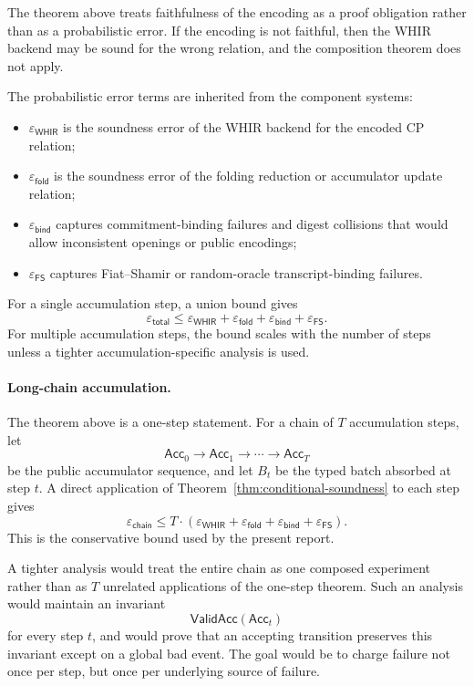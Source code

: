 \documentclass[11pt]{article}
\theoremstyle{definition}
\newcommand{\WHIR}{\mathsf{WHIR}}
\newcommand{\Acc}{\mathsf{Acc}}
\begin{document}
The theorem above treats faithfulness of the encoding as a proof obligation
rather than as a probabilistic error. If the encoding is not faithful, then the
WHIR backend may be sound for the wrong relation, and the composition theorem
does not apply.

The probabilistic error terms are inherited from the component systems:
\begin{itemize}
  \item $\varepsilon_{\WHIR}$ is the soundness error of the WHIR backend for the
        encoded CP relation;
  \item $\varepsilon_{\mathsf{fold}}$ is the soundness error of the folding
        reduction or accumulator update relation;
  \item $\varepsilon_{\mathsf{bind}}$ captures commitment-binding failures and
        digest collisions that would allow inconsistent openings or public
        encodings;
  \item $\varepsilon_{\mathsf{FS}}$ captures Fiat--Shamir or random-oracle
        transcript-binding failures.
\end{itemize}

For a single accumulation step, a union bound gives
\[
  \varepsilon_{\mathsf{total}}
  \leq
  \varepsilon_{\WHIR}
  +
  \varepsilon_{\mathsf{fold}}
  +
  \varepsilon_{\mathsf{bind}}
  +
  \varepsilon_{\mathsf{FS}}.
\]
For multiple accumulation steps, the bound scales with the number of steps
unless a tighter accumulation-specific analysis is used.

\paragraph{Long-chain accumulation.}
The theorem above is a one-step statement. For a chain of \(T\) accumulation
steps, let
\[
  \Acc_0 \to \Acc_1 \to \cdots \to \Acc_T
\]
be the public accumulator sequence, and let \(B_t\) be the typed batch absorbed
at step \(t\). A direct application of Theorem~\ref{thm:conditional-soundness}
to each step gives
\[
  \varepsilon_{\mathsf{chain}}
  \leq
  T\cdot
  \left(
    \varepsilon_{\WHIR}
    +
    \varepsilon_{\mathsf{fold}}
    +
    \varepsilon_{\mathsf{bind}}
    +
    \varepsilon_{\mathsf{FS}}
  \right).
\]
This is the conservative bound used by the present report.

A tighter analysis would treat the entire chain as one composed experiment
rather than as \(T\) unrelated applications of the one-step theorem. Such an
analysis would maintain an invariant
\[
  \mathsf{ValidAcc}(\Acc_t)
\]
for every step \(t\), and would prove that an accepting transition preserves
this invariant except on a global bad event. The goal would be to charge
failure not once per step, but once per underlying source of failure.
\end{document}
